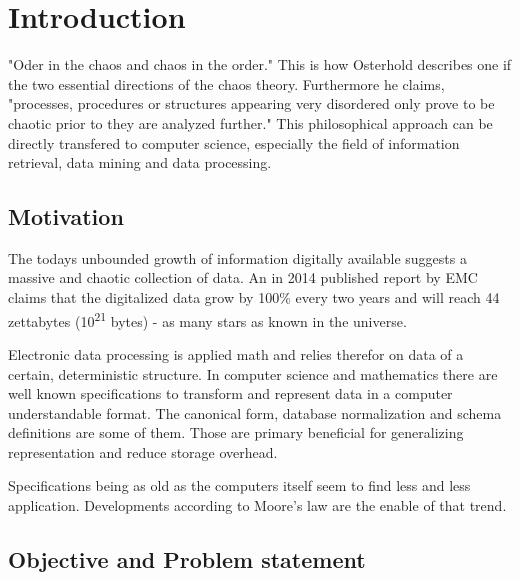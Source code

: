 \chapter{Introduction\label{cha:chapter1}}


"Oder in the chaos and chaos in the order." This is how Osterhold describes one if the two essential directions of the chaos theory. Furthermore he claims, "processes, procedures or structures appearing very disordered only prove to be chaotic prior to they are analyzed further." This philosophical approach can be directly transfered to computer science, especially the field of information retrieval, data mining and data processing. 

\section{Motivation\label{sec:moti}}


The todays unbounded growth of information digitally available suggests a massive and chaotic collection of data. An in 2014 published report by EMC claims that the digitalized data grow by 100\% every two years and will reach 44 zettabytes (10\textsuperscript{21} bytes) - as many stars as known in the universe. 

Electronic data processing is applied math and relies therefor on data of a certain, deterministic structure. In computer science and mathematics there are well known specifications to transform and represent data in a computer understandable format. The canonical form, database normalization and schema definitions are some of them. Those are primary beneficial for generalizing representation and reduce storage overhead.

Specifications being as old as the computers itself seem to find less and less application. Developments according to Moore's law are the enable of that trend. 



\section{Objective and Problem statement\label{sec:objective}}

